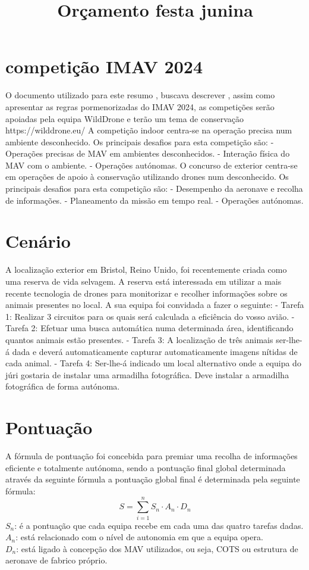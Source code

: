 \documentclass{article}
\date{}
\title{Orçamento festa junina}
\begin{document}
\maketitle
\tableofcontents
\newpage
\section{competição IMAV 2024}
O documento utilizado para este resumo , buscava descrever , assim como apresentar as regras pormenorizadas do IMAV 2024,  as competições serão apoiadas pela equipa WildDrone e terão um tema de conservação https://wilddrone.eu/
A competição indoor centra-se na operação precisa num ambiente desconhecido. Os principais desafios para esta competição são:
- Operações precisas de MAV em ambientes desconhecidos.
- Interação física do MAV com o ambiente.
- Operações autónomas.
O concurso de exterior centra-se em operações de apoio à conservação utilizando drones num
desconhecido. Os principais desafios para esta competição são:
- Desempenho da aeronave e recolha de informações.
- Planeamento da missão em tempo real.
- Operações autónomas.

\section{Cenário}
A localização exterior em Bristol, Reino Unido, foi recentemente criada como uma reserva de vida selvagem. A reserva está interessada em
utilizar a mais recente tecnologia de drones para monitorizar e recolher informações sobre os animais presentes no local. A sua equipa foi convidada a fazer o seguinte:
- Tarefa 1: Realizar 3 circuitos para os quais será calculada a eficiência do vosso avião.
- Tarefa 2: Efetuar uma busca automática numa determinada área, identificando quantos animais estão
presentes.
- Tarefa 3: A localização de três animais ser-lhe-á dada e deverá automaticamente
capturar automaticamente imagens nítidas de cada animal.
- Tarefa 4: Ser-lhe-á indicado um local alternativo onde a equipa do júri gostaria de
instalar uma armadilha fotográfica. Deve instalar a armadilha fotográfica de forma autónoma. 
\section{Pontuação}
A fórmula de pontuação foi concebida para premiar uma recolha de informações eficiente e totalmente autónoma, sendo a pontuação final global determinada através da seguinte fórmula
a pontuação global final é determinada pela seguinte fórmula:
$$S =\sum_{i = 1}^{n} S_{n}\cdot A_{n} \cdot D_{n}$$
$S_n$: é a pontuação que cada equipa recebe em cada uma das quatro tarefas dadas.\\
$A_n$: está relacionado com o nível de autonomia em que a equipa opera.\\
$D_n$: está ligado à concepção dos MAV utilizados, ou seja, COTS ou estrutura de aeronave de fabrico próprio.\\
\end{document}
